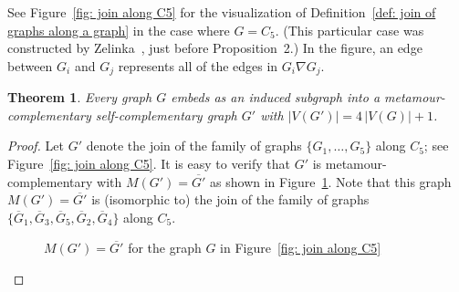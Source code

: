 \documentclass[12pt]{amsart}
\newtheorem{theorem}{Theorem}[section]
\theoremstyle{definition}
\theoremstyle{remark}
\numberwithin{equation}{section}
\numberwithin{figure}{section}
\begin{document}
See Figure~\ref{fig: join along C5} for the visualization of Definition~\ref{def: join of graphs along a graph} in the case where $G = C_5$.
(This particular case was constructed by Zelinka~\cite{Zelinka}, just before Proposition~2.)
In the figure, an edge between $G_i$ and $G_j$ represents all of the edges in $G_i \nabla G_j$. 

\begin{theorem} \label{thm: selfcomp}
    Every graph $G$ embeds as an induced subgraph into a metamour-complementary self-complementary graph $G'$ with $|V(G')| = 4\, |V(G)|+1$.
\end{theorem}

\begin{proof}
   Let $G'$ denote the join of the family of graphs $\{G_1, \ldots, G_5\}$ along $C_5$; see Figure~\ref{fig: join along C5}. It is easy to verify that $G'$ is metamour-complementary with $M(G')=\overline{G'}$ as shown in Figure~\ref{fig: metamour along C5}. Note that this graph $M(G')=\overline{G'}$ is (isomorphic to) the join of the family of graphs $\{\overline{G}_1, \overline{G}_3, \overline{G}_5, \overline{G}_2, \overline{G}_4\}$  along $C_5$.
   
\begin{figure}[h!]
            \begin{center}
            \end{center}
            \caption{$M(G')=\overline{G'}$ for the graph $G$ in Figure~\ref{fig: join along C5}}
            \label{fig: metamour along C5}
        \end{figure}  


\end{proof}
\end{document}
